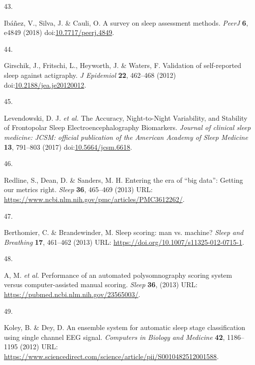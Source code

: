 \documentclass[
  10pt,
]{scrbook}
\newlength{\cslhangindent}
\newlength{\csllabelwidth}
\newlength{\cslentryspacingunit} %
\newenvironment{CSLReferences}[2] %
 {%
  \setlength{\parindent}{0pt}
  \ifodd #1
  \let\oldpar\par
  \def\par{\hangindent=\cslhangindent\oldpar}
  \fi
  \setlength{\parskip}{#2\cslentryspacingunit}
 }%
 {}
\newcommand{\CSLLeftMargin}[1]{\parbox[t]{\csllabelwidth}{#1}}
\newcommand{\CSLRightInline}[1]{\parbox[t]{\linewidth - \csllabelwidth}{#1}\break}
\let\originaltextbf\textbf
\renewcommand{\textbf}[1]{\textcolor{color1}{\originaltextbf{#1}}}
\begin{document}
\begin{CSLReferences}{0}{0}
\leavevmode{}%
\CSLLeftMargin{43. }%
\CSLRightInline{Ibáñez, V., Silva, J. \& Cauli, O. A survey on sleep
assessment methods. \emph{PeerJ} \textbf{6}, e4849 (2018)
doi:\href{https://doi.org/10.7717/peerj.4849}{10.7717/peerj.4849}.}

\leavevmode{}%
\CSLLeftMargin{44. }%
\CSLRightInline{Girschik, J., Fritschi, L., Heyworth, J. \& Waters, F.
Validation of self-reported sleep against actigraphy. \emph{J Epidemiol}
\textbf{22}, 462--468 (2012)
doi:\href{https://doi.org/10.2188/jea.je20120012}{10.2188/jea.je20120012}.}

\leavevmode{}%
\CSLLeftMargin{45. }%
\CSLRightInline{Levendowski, D. J. \emph{et al.} The Accuracy,
Night-to-Night Variability, and Stability of Frontopolar Sleep
Electroencephalography Biomarkers. \emph{Journal of clinical sleep
medicine: JCSM: official publication of the American Academy of Sleep
Medicine} \textbf{13}, 791--803 (2017)
doi:\href{https://doi.org/10.5664/jcsm.6618}{10.5664/jcsm.6618}.}

\leavevmode{}%
\CSLLeftMargin{46. }%
\CSLRightInline{Redline, S., Dean, D. \& Sanders, M. H. Entering the era
of {``}big data{''}: Getting our metrics right. \emph{Sleep}
\textbf{36}, 465--469 (2013) URL:
\url{https://www.ncbi.nlm.nih.gov/pmc/articles/PMC3612262/}.}

\leavevmode{}%
\CSLLeftMargin{47. }%
\CSLRightInline{Berthomier, C. \& Brandewinder, M. Sleep scoring: man
vs. machine? \emph{Sleep and Breathing} \textbf{17}, 461--462 (2013)
URL: \url{https://doi.org/10.1007/s11325-012-0715-1}.}

\leavevmode{}%
\CSLLeftMargin{48. }%
\CSLRightInline{A, M. \emph{et al.} Performance of an automated
polysomnography scoring system versus computer-assisted manual scoring.
\emph{Sleep} \textbf{36}, (2013) URL:
\url{https://pubmed.ncbi.nlm.nih.gov/23565003/}.}

\leavevmode{}%
\CSLLeftMargin{49. }%
\CSLRightInline{Koley, B. \& Dey, D. An ensemble system for automatic
sleep stage classification using single channel EEG signal.
\emph{Computers in Biology and Medicine} \textbf{42}, 1186--1195 (2012)
URL:
\url{https://www.sciencedirect.com/science/article/pii/S0010482512001588}.}


\end{CSLReferences}
\end{document}

